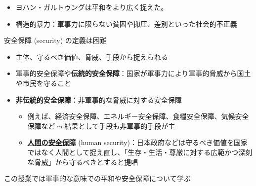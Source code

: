 \documentclass[
  xelatex,
  ja=standard]{bxjsarticle}
\providecommand{\tightlist}{%
  \setlength{\itemsep}{0pt}\setlength{\parskip}{0pt}}\usepackage{longtable,booktabs,array}
\begin{document}
\begin{itemize}
\tightlist
\item
  ヨハン・ガルトゥングは平和をより広く捉えた。
\item
  構造的暴力：軍事力に限らない貧困や抑圧、差別といった社会的不正義
\end{itemize}

安全保障 (security) の定義は困難

\begin{itemize}
\tightlist
\item
  主体、守るべき価値、脅威、手段から捉えられる\citep[第1章]{boudai2018}
\item
  軍事的安全保障や\textbf{伝統的安全保障}：国家が軍事力により軍事的脅威から国土や市民を守ること
\item
  \textbf{非伝統的安全保障}：非軍事的な脅威に対する安全保障

  \begin{itemize}
  \tightlist
  \item
    例えば、経済安全保障、エネルギー安全保障、食糧安全保障、気候安全保障など\(\leadsto\)結果として手段も非軍事的手段が主
  \item
    \href{https://www.mofa.go.jp/mofaj/gaiko/oda/bunya/security/index.html}{\textbf{人間の安全保障}}
    (human
    security)：日本政府などは守るべき価値を国家ではなく人間として捉え直し、「生存・生活・尊厳に対する広範かつ深刻な脅威」から守るべきとすると提唱
  \end{itemize}
\end{itemize}

この授業では軍事的な意味での平和や安全保障について学ぶ


  
\end{document}
